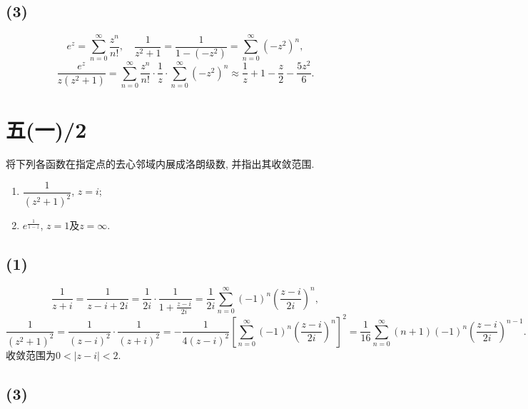 \documentclass[11pt,a4paper]{article}
\begin{document}
\subsection*{(3)}
$$e^z=\sum_{n=0}^\infty\frac{z^n}{n!},\quad \frac{1}{z^2+1}=\frac{1}{1-(-z^2)}=\sum_{n=0}^\infty (-z^2)^n, $$
$$\frac{e^z}{z(z^2+1)}=\sum_{n=0}^\infty\frac{z^n}{n!}\cdot\frac{1}{z}\cdot\sum_{n=0}^\infty (-z^2)^n\approx\frac{1}{z}+1-\frac{z}{2}-\frac{5z^2}{6}.$$

\section{五(一)/2}
将下列各函数在指定点的去心邻域内展成洛朗级数, 并指出其收敛范围.
\begin{enumerate}
  \item $\dfrac{1}{(z^2+1)^2}$, $z=i$;
        \addtocounter{enumi}{1}
  \item $e^{\frac{1}{1-z}}$, $z=1$及$z=\infty$.
\end{enumerate}

\subsection*{(1)}
$$\frac{1}{z+i}=\frac{1}{z-i+2i}=\frac{1}{2i}\cdot\frac{1}{1+\frac{z-i}{2i}}=\frac{1}{2i}\sum_{n=0}^\infty(-1)^n\left(\frac{z-i}{2i}\right)^n,$$
$$\frac{1}{(z^2+1)^2}=\frac{1}{(z-i)^2}\cdot\frac{1}{(z+i)^2}=-\frac{1}{4(z-i)^2}\left[\sum_{n=0}^\infty(-1)^n\left(\frac{z-i}{2i}\right)^n\right]^2=\frac{1}{16}\sum_{n=0}^\infty(n+1)(-1)^n\left(\frac{z-i}{2i}\right)^{n-1}.$$
收敛范围为$0<|z-i|<2$.

\subsection*{(3)}
\end{document}
